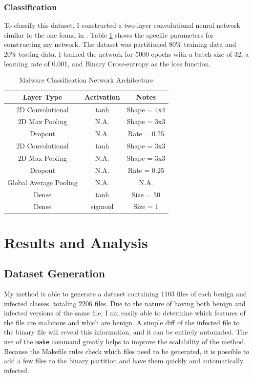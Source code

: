 \documentclass[12pt, letterpaper, titlepage]{article}
\newcommand{\tabRef}[1]{Table \ref{#1}}
\newcommand{\benignFiles}{1103}
\newcommand{\totalFiles}{2206}
\newcommand{\maxTrainingEpochs}{5000}
\newcommand{\batchSize}{32}
\newcommand{\learningRate}{0.001}
\newcommand{\trainPercent}{80\%}
\newcommand{\testPercent}{20\%}
\begin{document}
\subsubsection{Classification}
To classify this dataset, I constructed a two-layer convolutional neural network similar to the one found in \cite{Sgandurra}.
\tabRef{tab:NetArch} shows the specific parameters for constructing my network.
The dataset was partitioned \trainPercent{} training data and \testPercent{} testing data.
I trained the network for \maxTrainingEpochs{} epochs with a batch size of \batchSize{}, a learning rate of \learningRate{}, and Binary Cross-entropy as the loss function.

\begin{table}[H]
  \caption{Malware Classification Network Architecture}
  \begin{center}
    \begin{tabular}{ccc}
      \hline
      \textbf{Layer Type} & \textbf{Activation} & \textbf{Notes}\\
      \hline
      2D Convolutional & tanh & Shape = 4x4\\
      \hline
      2D Max Pooling & N.A. & Shape = 3x3\\
      \hline
      Dropout & N.A. & Rate = 0.25\\
      \hline
      2D Convolutional & tanh & Shape = 3x3\\
      \hline
      2D Max Pooling & N.A. & Shape = 3x3\\
      \hline
      Dropout & N.A. & Rate = 0.25\\
      \hline
      Global Average Pooling & N.A. & N.A. \\
      \hline
      Dense & tanh & Size = 50\\
      \hline
      Dense & sigmoid & Size = 1\\
      \hline
    \end{tabular}
  \end{center}
  \label{tab:NetArch}
\end{table}

\pagebreak

\section{Results and Analysis}
\subsection{Dataset Generation}
My method is able to generate a dataset containing \benignFiles{} files of each benign and infected classes, totaling \totalFiles{} files.
Due to the nature of having both benign and infected versions of the same file, I am easily able to determine which features of the file are malicious and which are benign.
A simple diff of the infected file to the binary file will reveal this information, and it can be entirely automated.
The use of the \verb|make| command greatly helps to improve the scalability of the method.
Because the Makefile rules check which files need to be generated, it is possible to add a few files to the binary partition and have them quickly and automatically infected.
\end{document}
